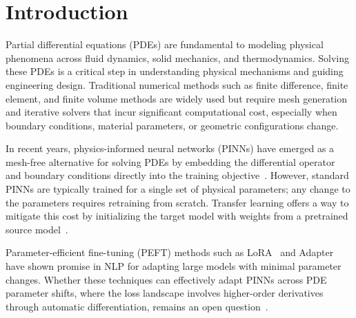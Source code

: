 \section{Introduction}
\label{sec:intro}

Partial differential equations (PDEs)
are fundamental to modeling physical phenomena across fluid dynamics,
solid mechanics, and thermodynamics.
Solving these PDEs is a critical step in understanding physical mechanisms and
guiding engineering design.
Traditional numerical methods such as finite difference, finite element,
and finite volume methods are widely used but require mesh generation and
iterative solvers that incur significant computational cost,
especially when boundary conditions, material parameters,
or geometric configurations change.

In recent years, physics-informed neural networks (PINNs)
have emerged as a mesh-free alternative for solving PDEs by embedding the
differential operator and boundary conditions directly into the
training objective~\cite{raissi2019pinn}.
However, standard PINNs are typically trained for a single set of physical
parameters; any change to the parameters requires retraining from scratch.
Transfer learning offers a way to mitigate this cost by initializing the target
model with weights from a pretrained source model~\cite{wang2023expert}.

Parameter-efficient fine-tuning (PEFT)
methods such as LoRA~\cite{hu2022lora} and Adapter~\cite{houlsby2019adapter}
have
shown
promise in NLP for adapting large models with minimal parameter changes.
Whether these techniques can effectively adapt PINNs across PDE parameter
shifts, where the loss landscape involves higher-order derivatives
through automatic differentiation,
remains an open question~\cite{biderman2024lora}.
